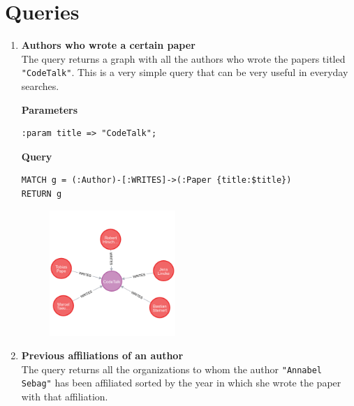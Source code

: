 \section{Queries}
\label{sec:queries}%
\begin{enumerate}
    \item \textbf{Authors who wrote a certain paper} \\
    The query returns a graph with all the authors who wrote the papers titled \verb|"CodeTalk"|.
    This is a very simple query that can be very useful in everyday searches.

    \textbf{Parameters}
    \begin{lstlisting}[label={lst:parameters_query1neo4j}]
:param title => "CodeTalk";
    \end{lstlisting}
    \textbf{Query}
    \begin{lstlisting}[label={lst:query1neo4j}]
MATCH g = (:Author)-[:WRITES]->(:Paper {title:$title})
RETURN g
    \end{lstlisting}
    \begin{figure}[H]
        \begin{center}
            \includegraphics[trim={0 1cm 0 0}, clip, width=0.45\textwidth]{Images/query1neo4j}
            \label{fig:query1neo4j}%
        \end{center}
    \end{figure}
    \item \textbf{Previous affiliations of an author} \\
    The query returns all the organizations to whom the author \verb|"Annabel Sebag"| has been affiliated sorted by the year in which she wrote the paper with that affiliation.


\end{enumerate}
